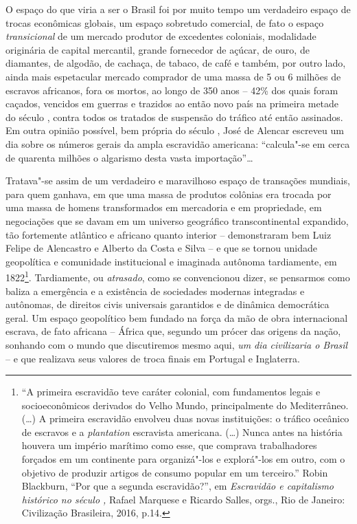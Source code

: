 O espaço do que viria a ser o Brasil foi por muito tempo um verdadeiro
espaço de trocas econômicas globais, um espaço sobretudo comercial, de
fato o espaço \emph{transicional} de um mercado produtor de excedentes
coloniais, modalidade originária de capital mercantil, grande fornecedor
de açúcar, de ouro, de diamantes, de algodão, de cachaça, de tabaco, de
café e também, por outro lado, ainda mais espetacular mercado comprador
de uma massa de 5 ou 6 milhões de escravos africanos, fora os mortos, ao
longo de 350 anos -- 42\% dos quais foram caçados, vencidos em guerras e
trazidos ao então novo país na primeira metade do século , contra
todos os tratados de suspensão do tráfico até então assinados. Em outra
opinião possível, bem própria do século , José de Alencar escreveu um
dia sobre os números gerais da ampla escravidão americana: ``calcula"-se
em cerca de quarenta milhões o algarismo desta vasta importação''\ldots{}

Tratava"-se assim de um verdadeiro e maravilhoso espaço de transações
mundiais, para quem ganhava, em que uma massa de produtos colônias era
trocada por uma massa de homens transformados em mercadoria e em
propriedade, em negociações que se davam em um universo geográfico
transcontinental expandido, tão fortemente atlântico e africano quanto
interior -- demonstraram bem Luiz Felipe de Alencastro e Alberto da
Costa e Silva -- e que se tornou unidade geopolítica e comunidade
institucional e imaginada autônoma tardiamente, em 1822\footnote{``A
  primeira escravidão teve caráter colonial, com fundamentos legais e
  socioeconômicos derivados do Velho Mundo, principalmente do
  Mediterrâneo. (\ldots{}) A primeira escravidão envolveu duas novas
  instituições: o tráfico oceânico de escravos e a \emph{plantation}
  escravista americana. (\ldots{}) Nunca antes na história houvera um império
  marítimo como esse, que comprava trabalhadores forçados em um
  continente para organizá"-los e explorá"-los em outro, com o objetivo de
  produzir artigos de consumo popular em um terceiro.'' Robin Blackburn,
  ``Por que a segunda escravidão?'', em \emph{Escravidão e capitalismo
  histórico no século ,} Rafael Marquese e Ricardo Salles, orgs., Rio
  de Janeiro: Civilização Brasileira, 2016, p.14.}. Tardiamente, ou
\emph{atrasado}, como se convencionou dizer, se pensarmos como baliza a
emergência e a existência de sociedades modernas integradas e autônomas,
de direitos civis universais garantidos e de dinâmica democrática geral.
Um espaço geopolítico bem fundado na força da mão de obra internacional
escrava, de fato africana -- África que, segundo um prócer das origens
da nação, sonhando com o mundo que discutiremos mesmo aqui, \emph{um}
\emph{dia civilizaria o Brasil} -- e que realizava seus valores de troca
finais em Portugal e Inglaterra.

